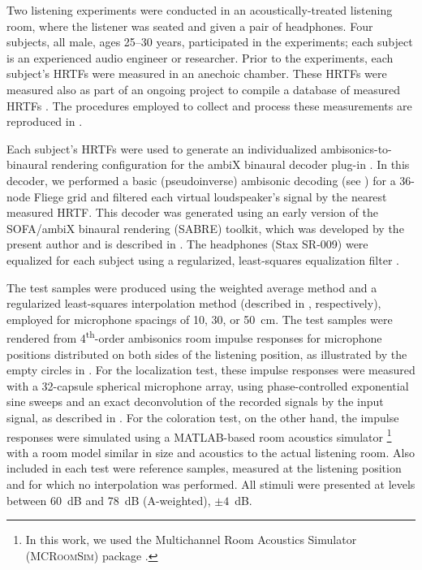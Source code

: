 Two listening experiments were conducted in an acoustically-treated listening room,
where the listener was seated and given a pair of headphones.
Four subjects, all male, ages 25--30 years, participated in the experiments;
each subject is an experienced audio engineer or researcher.
Prior to the experiments, each subject's HRTFs were measured in an anechoic chamber.
These HRTFs were measured also as part of an ongoing project to compile a database of measured HRTFs \citep{Sridhar2017}.
The procedures employed to collect and process these measurements are reproduced in .

Each subject's HRTFs were used to generate an individualized ambisonics-to-binaural rendering configuration for the ambiX binaural decoder plug-in \citep{Kronlachner2013,ambiXPlugInURL}.
In this decoder, we performed a basic (pseudoinverse) ambisonic decoding (see ) for a 36-node Fliege grid and filtered each virtual loudspeaker's signal by the nearest measured HRTF.
This decoder was generated using an early version of the SOFA/ambiX binaural rendering (SABRE) toolkit, which was developed by the present author and is described in .
The headphones (Stax SR-009) were equalized for each subject using a regularized, least-squares equalization filter \citep{ScharerLindau2009}.

The test samples were produced using the weighted average method and a regularized least-squares interpolation method (described in , respectively), employed for microphone spacings of 10, 30, or 50~cm.
The test samples were rendered from 4\textsuperscript{th}-order ambisonics room impulse responses for microphone positions distributed on both sides of the listening position, as illustrated by the empty circles in .
For the localization test, these impulse responses were measured with a 32-capsule spherical microphone array, using phase-controlled exponential sine sweeps and an exact deconvolution of the recorded signals by the input signal, as described in .
For the coloration test, on the other hand, the impulse responses were simulated using a MATLAB-based room acoustics simulator%
\footnote{In this work, we used the Multichannel Room Acoustics Simulator (\textsc{MCRoomSim}) package \citep{Wabnitz2010,MCRoomSimURL}.}
with a room model similar in size and acoustics to the actual listening room.
Also included in each test were reference samples, measured at the listening position and for which no interpolation was performed.
All stimuli were presented at levels between 60~dB and 78~dB (A-weighted), $\pm4$~dB.

